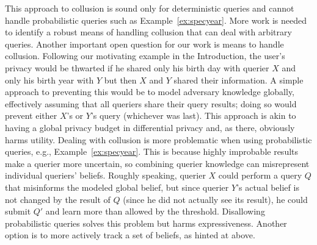 This approach to collusion is sound only for deterministic queries
and cannot handle probabilistic queries such as Example~\ref{ex:specyear}.
More work is needed to identify a robust means of handling collusion
that can deal with arbitrary queries.
\else
Another important open question for our work is means to handle
collusion.  Following our motivating example in the Introduction, the
user's privacy would be thwarted if he shared only his birth day with
querier $X$ and only his birth year with $Y$ but then $X$ and $Y$
shared their information.  A simple approach to preventing this would
be to model adversary knowledge globally, effectively assuming that
all queriers share their query results; doing so would prevent either
$X$'s or $Y$'s query (whichever was last).  This approach is akin to
having a global privacy budget in differential privacy and, as there,
obviously harms utility.  Dealing with collusion is more problematic
when using probabilistic queries, e.g., Example~\ref{ex:specyear}.
This is because highly improbable results make a querier more
uncertain, so combining querier knowledge can misrepresent individual
queriers' beliefs.  Roughly speaking, querier $X$ could perform a
query $Q$ that misinforms the modeled global belief, but since querier
$Y$'s actual belief is not changed by the result of $Q$ (since he did
not actually see its result), he could submit $Q'$ and learn more than
allowed by the threshold.  Disallowing probabilistic queries
solves this problem but harms expressiveness.  Another option is to more
actively track a set of beliefs, as hinted at above.
\fi



